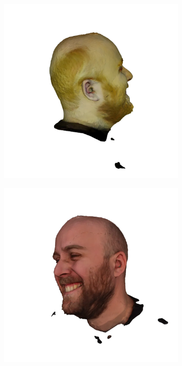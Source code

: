 \begin{figure}
\begin{subfigure}{0.18\linewidth}
        \includegraphics[width=\textwidth]{Figures/failed/stross/3d/snapshot17.png}
	\end{subfigure}
    \begin{subfigure}{0.18\linewidth}
        \includegraphics[width=\textwidth]{Figures/failed/stross/3d/snapshot20.png}

\end{subfigure}
\end{figure}
